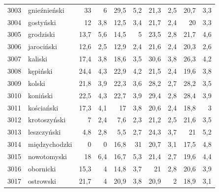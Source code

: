 \begin{center}
\begin{longtable}{lp{3cm}rrrrrrrr}
3003 & gnieźnieński            & 33      & 6           & 29,5     & 5,2          & 21,3     & 2,5          & 20,7     & 3,3          \\
3004 & gostyński               & 12      & 3,8         & 12,5     & 3,4          & 21,7     & 2,4          & 20       & 3,3          \\
3005 & grodziski               & 13,7    & 5,6         & 14,5     & 5            & 23,5     & 2,8          & 21,7     & 4,6          \\
3006 & jarociński              & 12,6    & 2,5         & 12,9     & 2,4          & 21,6     & 2,4          & 20,3     & 2,6          \\
3007 & kaliski                 & 17,4    & 3,8         & 18,6     & 3,5          & 30,6     & 3,8          & 26,3     & 4,2          \\
3008 & kępiński                & 24,4    & 4,3         & 22,9     & 4,2          & 21,5     & 2,4          & 19,6     & 3,8          \\
3009 & kolski                  & 21,8    & 3,9         & 22,3     & 3,6          & 28,2     & 2,7          & 28,2     & 3,5          \\
3010 & koniński                & 22,5    & 4,3         & 22,7     & 3,9          & 29,4     & 2,8          & 28,4     & 3,9          \\
3011 & kościański              & 17,3    & 4,1         & 17       & 3,8          & 20,6     & 2,4          & 18,8     & 3            \\
3012 & krotoszyński            & 7       & 2,4         & 7,6      & 2,3          & 21,2     & 2,5          & 21,6     & 3,5          \\
3013 & leszczyński             & 4,8     & 2,8         & 5,5      & 2,7          & 24,3     & 3,7          & 21       & 5,2          \\
3014 & międzychodzki           & 0       & 0           & 16,8     & 31           & 20,7     & 3,1          & 17,5     & 4,8          \\
3015 & nowotomyski             & 18      & 6,4         & 16,7     & 5,3          & 21,4     & 2,7          & 19,6     & 4,4          \\
3016 & obornicki               & 15,3    & 4           & 14,8     & 3,7          & 21       & 2,8          & 20,6     & 3,9          \\
3017 & ostrowski               & 21,7    & 4           & 20,9     & 3,8          & 20,9     & 2            & 18,9     & 3,1          \\

\end{longtable}
\end{center}
